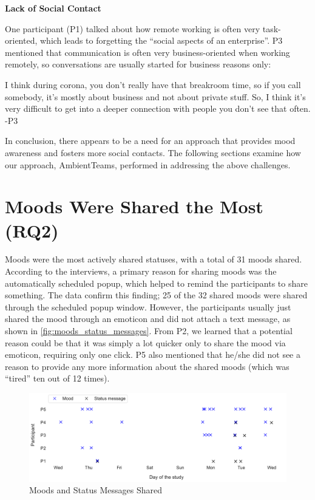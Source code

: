 \bigskip\noindent\textbf{Lack of Social Contact}

\medskip\noindent One participant (P1) talked about how remote working is often very task-oriented, which leads to forgetting the \enquote{social aspects of an enterprise}. P3 mentioned that communication is often very business-oriented when working remotely, so conversations are usually started for business reasons only:

\begin{displayquote}
    I think during corona, you don't really have that breakroom time, so if you call somebody, it's mostly about business and not about private stuff. So, I think it's very difficult to get into a deeper connection with people you don't see that often. -P3
\end{displayquote}

In conclusion, there appears to be a need for an approach that provides mood awareness and fosters more social contacts. The following sections examine how our approach, AmbientTeams, performed in addressing the above challenges.

\section{Moods Were Shared the Most (RQ2)}
Moods were the most actively shared statuses, with a total of 31 moods shared. According to the interviews, a primary reason for sharing moods was the automatically scheduled popup, which helped to remind the participants to share something. The data confirm this finding; 25 of the 32 shared moods were shared through the scheduled popup window. However, the participants usually just shared the mood through an emoticon and did not attach a text message, as shown in \autoref{fig:moods_status_messages}. From P2, we learned that a potential reason could be that it was simply a lot quicker only to share the mood via emoticon, requiring only one click. P5 also mentioned that he/she did not see a reason to provide any more information about the shared moods (which was \enquote{tired} ten out of 12 times).

\begin{figure}[h]
    \centering
    \includegraphics[width=\linewidth]{plots/moods_status_messages.pdf}
    \caption{Moods and Status Messages Shared}
    \label{fig:moods_status_messages}
\end{figure}

